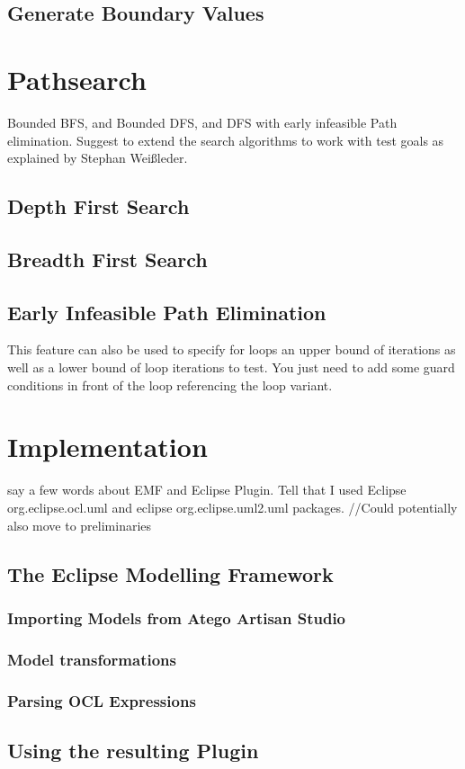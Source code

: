 \subsection{Generate Boundary Values}
\section{Pathsearch}
Bounded BFS, and Bounded DFS, and DFS with early infeasible Path elimination.
Suggest to extend the search algorithms to work with test goals as explained by Stephan Weißleder.
\subsection{Depth First Search}
\subsection{Breadth First Search}
\subsection{Early Infeasible Path Elimination}
This feature can also be used to specify for loops an upper bound of iterations as well as a lower bound of loop iterations to test. You just need to add some guard conditions in front of the loop referencing the loop variant.
\section{Implementation}
say a few words about EMF and Eclipse Plugin. Tell that I used Eclipse org.eclipse.ocl.uml and eclipse org.eclipse.uml2.uml packages. //Could potentially also move to preliminaries
\subsection{The Eclipse Modelling Framework}
\cite{EMF}
\subsubsection{Importing Models from Atego Artisan Studio}
\subsubsection{Model transformations}
\subsubsection{Parsing OCL Expressions}
\subsection{Using the resulting Plugin}

